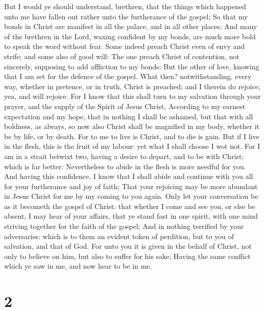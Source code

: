  But I would ye should understand, brethren, that the
things which happened unto me have fallen out rather unto the
furtherance of the gospel;  So that my bonds in Christ
are manifest in all the palace, and in all other places; 
And many of the brethren in the Lord, waxing confident by my bonds, are
much more bold to speak the word without fear.  Some
indeed preach Christ even of envy and strife; and some also of good
will:  The one preach Christ of contention, not
sincerely, supposing to add affliction to my bonds:  But
the other of love, knowing that I am set for the defence of the gospel.
 What then? notwithstanding, every way, whether in
pretence, or in truth, Christ is preached; and I therein do rejoice,
yea, and will rejoice.  For I know that this shall turn
to my salvation through your prayer, and the supply of the Spirit of
Jesus Christ,  According to my earnest expectation and my
hope, that in nothing I shall be ashamed, but that with all boldness, as
always, so now also Christ shall be magnified in my body, whether it be
by life, or by death.  For to me to live is Christ, and
to die is gain.  But if I live in the flesh, this is the
fruit of my labour: yet what I shall choose I wot not. 
For I am in a strait betwixt two, having a desire to depart, and to be
with Christ; which is far better:  Nevertheless to abide
in the flesh is more needful for you.  And having this
confidence, I know that I shall abide and continue with you all for your
furtherance and joy of faith;  That your rejoicing may be
more abundant in Jesus Christ for me by my coming to you again.
 Only let your conversation be as it becometh the gospel
of Christ: that whether I come and see you, or else be absent, I may
hear of your affairs, that ye stand fast in one spirit, with one mind
striving together for the faith of the gospel;  And in
nothing terrified by your adversaries: which is to them an evident token
of perdition, but to you of salvation, and that of God. 
For unto you it is given in the behalf of Christ, not only to believe on
him, but also to suffer for his sake;  Having the same
conflict which ye saw in me, and now hear to be in me.

\hypertarget{section-1}{%
\section{2}\label{section-1}}

